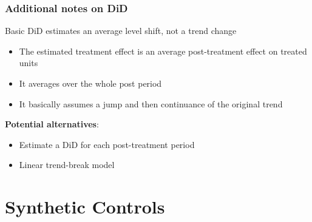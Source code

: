 \documentclass[10pt]{article}
\begin{document}
\subsubsection{Additional notes on DiD}
Basic DiD estimates an average level shift, not a trend change 
\begin{itemize}
    \item The estimated treatment effect is an average post-treatment effect on treated units 
    \item It averages over the whole post period 
    \item It basically assumes a jump and then continuance of the original trend 
\end{itemize}
\textbf{Potential alternatives}:
\begin{itemize}
    \item Estimate a DiD for each post-treatment period 
    \item Linear trend-break model 
\end{itemize}
\section{Synthetic Controls}
\end{document}
